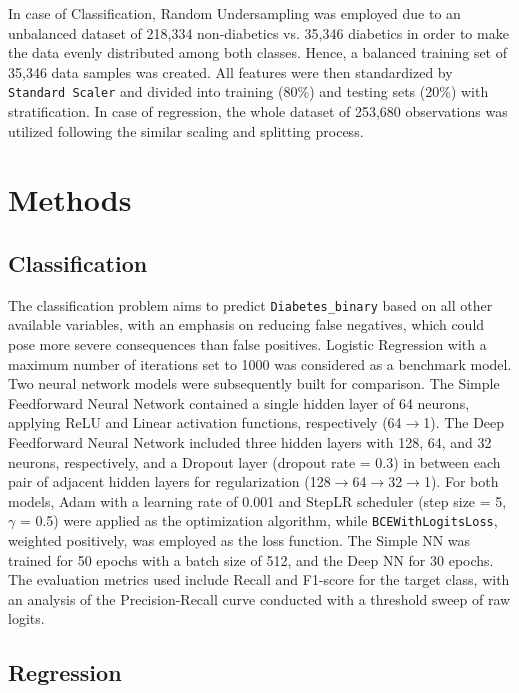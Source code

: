 \documentclass{article}
\begin{document}
In case of Classification, Random Undersampling was employed due to an unbalanced dataset of 218,334 non-diabetics vs. 35,346 diabetics in order to make the data evenly distributed among both classes. Hence, a balanced training set of 35,346 data samples was created. All features were then standardized by \texttt{Standard Scaler} and divided into training (80\%) and testing sets (20\%) with stratification. In case of regression, the whole dataset of 253,680 observations was utilized following the similar scaling and splitting process.

\section{Methods}

\subsection{Classification}

The classification problem aims to predict \texttt{Diabetes\_binary} based on all other available variables, with an emphasis on reducing false negatives, which could pose more severe consequences than false positives. Logistic Regression with a maximum number of iterations set to 1000 was considered as a benchmark model. Two neural network models were subsequently built for comparison. The Simple Feedforward Neural Network contained a single hidden layer of 64 neurons, applying ReLU and Linear activation functions, respectively (64$\rightarrow$1). The Deep Feedforward Neural Network included three hidden layers with 128, 64, and 32 neurons, respectively, and a Dropout layer (dropout rate = 0.3) in between each pair of adjacent hidden layers for regularization (128$\rightarrow$64$\rightarrow$32$\rightarrow$1). For both models, Adam with a learning rate of 0.001 and StepLR scheduler (step size = 5, $\gamma$ = 0.5) were applied as the optimization algorithm, while \texttt{BCEWithLogitsLoss}, weighted positively, was employed as the loss function. The Simple NN was trained for 50 epochs with a batch size of 512, and the Deep NN for 30 epochs. The evaluation metrics used include Recall and F1-score for the target class, with an analysis of the Precision-Recall curve conducted with a threshold sweep of raw logits.

\subsection{Regression}
\end{document}
